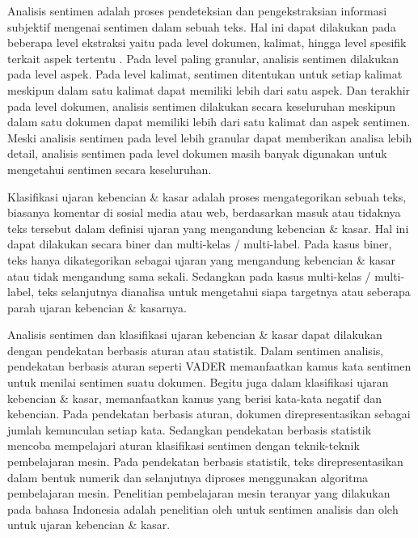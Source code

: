 Analisis sentimen adalah proses pendeteksian dan pengekstraksian informasi subjektif mengenai sentimen dalam sebuah teks. Hal ini dapat dilakukan pada beberapa level ekstraksi yaitu pada level dokumen, kalimat, hingga level spesifik terkait aspek tertentu \parencite{Liu2012}. Pada level paling granular, analisis sentimen dilakukan pada level aspek. Pada level kalimat, sentimen ditentukan untuk setiap kalimat meskipun dalam satu kalimat dapat memiliki lebih dari satu aspek. Dan terakhir pada level dokumen, analisis sentimen dilakukan secara keseluruhan meskipun dalam satu dokumen dapat memiliki lebih dari satu kalimat dan aspek sentimen. Meski analisis sentimen pada level lebih granular dapat memberikan analisa lebih detail, analisis sentimen pada level dokumen masih banyak digunakan untuk mengetahui sentimen secara keseluruhan.

Klasifikasi ujaran kebencian \& kasar adalah proses mengategorikan sebuah teks, biasanya komentar di sosial media atau web, berdasarkan masuk atau tidaknya teks tersebut dalam definisi ujaran yang mengandung kebencian \& kasar. Hal ini dapat dilakukan secara biner dan multi-kelas / multi-label. Pada kasus biner, teks hanya dikategorikan sebagai ujaran yang mengandung kebencian \& kasar atau tidak mengandung sama sekali. Sedangkan pada kasus multi-kelas / multi-label, teks selanjutnya dianalisa untuk mengetahui siapa targetnya atau seberapa parah ujaran kebencian \& kasarnya.

Analisis sentimen dan klasifikasi ujaran kebencian \& kasar dapat dilakukan dengan pendekatan berbasis aturan atau statistik. Dalam sentimen analisis, pendekatan berbasis aturan seperti VADER \parencite{VADER} memanfaatkan kamus kata sentimen untuk menilai sentimen suatu dokumen. Begitu juga dalam klasifikasi ujaran kebencian \& kasar, \parencite{lexicon_hatespeech_2015} memanfaatkan kamus yang berisi kata-kata negatif dan kebencian. Pada pendekatan berbasis aturan, dokumen direpresentasikan sebagai jumlah kemunculan setiap kata. Sedangkan pendekatan berbasis statistik mencoba mempelajari aturan klasifikasi sentimen dengan teknik-teknik pembelajaran mesin. Pada pendekatan berbasis statistik, teks direpresentasikan dalam bentuk numerik dan selanjutnya diproses menggunakan algoritma pembelajaran mesin. Penelitian pembelajaran mesin teranyar yang dilakukan pada bahasa Indonesia adalah penelitian oleh \parencite{CrisdayantiPurwarianti2019} untuk sentimen analisis dan oleh \parencite{Ibrohim_Budi_2019} untuk ujaran kebencian \& kasar.

